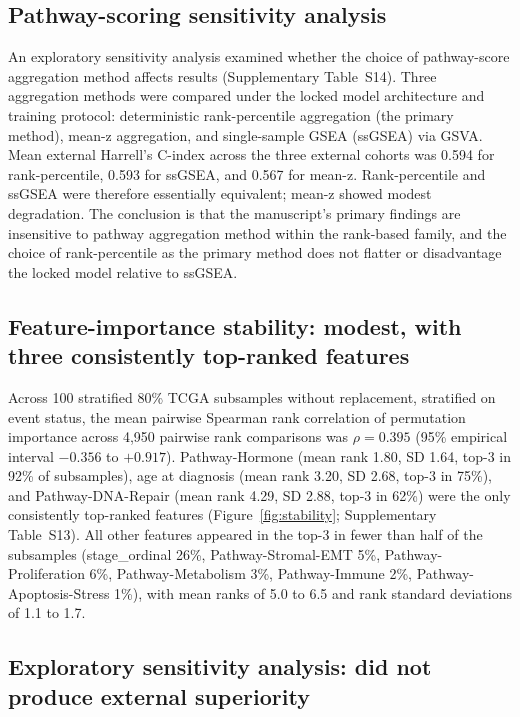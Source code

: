 \documentclass[11pt,letterpaper]{article}
\begin{document}
\subsection*{Pathway-scoring sensitivity analysis}

An exploratory sensitivity analysis examined whether the choice of pathway-score aggregation method affects results (Supplementary Table~S14). Three aggregation methods were compared under the locked model architecture and training protocol: deterministic rank-percentile aggregation (the primary method), mean-z aggregation, and single-sample GSEA (ssGSEA) via GSVA. Mean external Harrell's C-index across the three external cohorts was 0.594 for rank-percentile, 0.593 for ssGSEA, and 0.567 for mean-z. Rank-percentile and ssGSEA were therefore essentially equivalent; mean-z showed modest degradation. The conclusion is that the manuscript's primary findings are insensitive to pathway aggregation method within the rank-based family, and the choice of rank-percentile as the primary method does not flatter or disadvantage the locked model relative to ssGSEA.

\subsection*{Feature-importance stability: modest, with three consistently top-ranked features}

Across 100 stratified 80\% TCGA subsamples without replacement, stratified on event status, the mean pairwise Spearman rank correlation of permutation importance across 4,950 pairwise rank comparisons was $\rho = 0.395$ (95\% empirical interval $-0.356$ to $+0.917$). Pathway-Hormone (mean rank 1.80, SD 1.64, top-3 in 92\% of subsamples), age at diagnosis (mean rank 3.20, SD 2.68, top-3 in 75\%), and Pathway-DNA-Repair (mean rank 4.29, SD 2.88, top-3 in 62\%) were the only consistently top-ranked features (Figure~\ref{fig:stability}; Supplementary Table~S13). All other features appeared in the top-3 in fewer than half of the subsamples (stage\_ordinal 26\%, Pathway-Stromal-EMT 5\%, Pathway-Proliferation 6\%, Pathway-Metabolism 3\%, Pathway-Immune 2\%, Pathway-Apoptosis-Stress 1\%), with mean ranks of 5.0 to 6.5 and rank standard deviations of 1.1 to 1.7.

\subsection*{Exploratory sensitivity analysis: did not produce external superiority}
\end{document}
